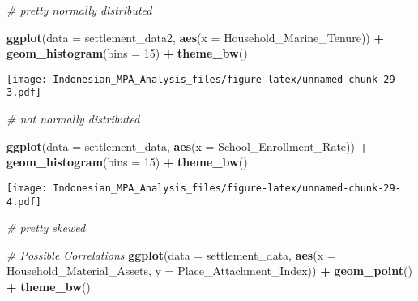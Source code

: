 \documentclass[
]{article}
\newenvironment{Shaded}{\begin{snugshade}}{\end{snugshade}}
\newcommand{\AttributeTok}[1]{\textcolor[rgb]{0.13,0.29,0.53}{#1}}
\newcommand{\CommentTok}[1]{\textcolor[rgb]{0.56,0.35,0.01}{\textit{#1}}}
\newcommand{\DecValTok}[1]{\textcolor[rgb]{0.00,0.00,0.81}{#1}}
\newcommand{\FunctionTok}[1]{\textcolor[rgb]{0.13,0.29,0.53}{\textbf{#1}}}
\newcommand{\NormalTok}[1]{#1}
\newcommand{\SpecialCharTok}[1]{\textcolor[rgb]{0.81,0.36,0.00}{\textbf{#1}}}
\newcommand{\StringTok}[1]{\textcolor[rgb]{0.31,0.60,0.02}{#1}}
\begin{document}
\begin{Shaded}
\begin{Highlighting}[]
\CommentTok{\# pretty normally distributed }

\FunctionTok{ggplot}\NormalTok{(}\AttributeTok{data =}\NormalTok{ settlement\_data2, }\FunctionTok{aes}\NormalTok{(}\AttributeTok{x =} \StringTok{\textasciigrave{}}\AttributeTok{Household\_Marine\_Tenure}\StringTok{\textasciigrave{}}\NormalTok{)) }\SpecialCharTok{+}
  \FunctionTok{geom\_histogram}\NormalTok{(}\AttributeTok{bins =} \DecValTok{15}\NormalTok{) }\SpecialCharTok{+}
  \FunctionTok{theme\_bw}\NormalTok{()}
\end{Highlighting}
\end{Shaded}

\texttt{[image: Indonesian\_MPA\_Analysis\_files/figure-latex/unnamed-chunk-29-3.pdf]}

\begin{Shaded}
\begin{Highlighting}[]
\CommentTok{\# not normally distributed}

\FunctionTok{ggplot}\NormalTok{(}\AttributeTok{data =}\NormalTok{ settlement\_data, }\FunctionTok{aes}\NormalTok{(}\AttributeTok{x =} \StringTok{\textasciigrave{}}\AttributeTok{School\_Enrollment\_Rate}\StringTok{\textasciigrave{}}\NormalTok{)) }\SpecialCharTok{+}
  \FunctionTok{geom\_histogram}\NormalTok{(}\AttributeTok{bins =} \DecValTok{15}\NormalTok{) }\SpecialCharTok{+}
  \FunctionTok{theme\_bw}\NormalTok{()}
\end{Highlighting}
\end{Shaded}

\texttt{[image: Indonesian\_MPA\_Analysis\_files/figure-latex/unnamed-chunk-29-4.pdf]}

\begin{Shaded}
\begin{Highlighting}[]
\CommentTok{\# pretty skewed}

\CommentTok{\# Possible Correlations}
\FunctionTok{ggplot}\NormalTok{(}\AttributeTok{data =}\NormalTok{ settlement\_data, }\FunctionTok{aes}\NormalTok{(}\AttributeTok{x =} \StringTok{\textasciigrave{}}\AttributeTok{Household\_Material\_Assets}\StringTok{\textasciigrave{}}\NormalTok{, }\AttributeTok{y =} \StringTok{\textasciigrave{}}\AttributeTok{Place\_Attachment\_Index}\StringTok{\textasciigrave{}}\NormalTok{)) }\SpecialCharTok{+}
  \FunctionTok{geom\_point}\NormalTok{() }\SpecialCharTok{+}
  \FunctionTok{theme\_bw}\NormalTok{()}
\end{Highlighting}
\end{Shaded}
\end{document}
